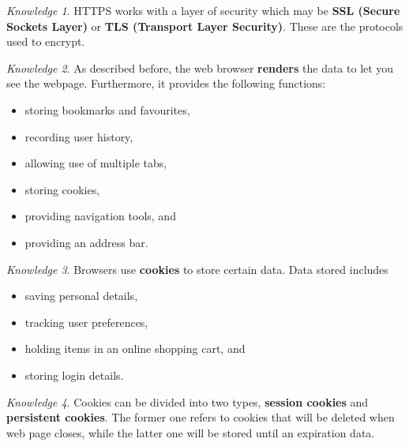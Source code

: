 \documentclass[8pt]{article}
\theoremstyle{remark}
\newtheorem{knowledge}{Knowledge}[subsection]
\begin{document}
            \begin{knowledge}
                HTTPS works with a layer of security which may be \textbf{SSL (Secure Sockets Layer)} or \textbf{TLS (Transport Layer Security)}. These are the protocols used to encrypt.
            \end{knowledge}

            \begin{knowledge}
                As described before, the web browser \textbf{renders} the data to let you see the webpage. Furthermore, it provides the following functions:
                \begin{itemize}
                    \item storing bookmarks and favourites,
                    \item recording user history,
                    \item allowing use of multiple tabs,
                    \item storing cookies,
                    \item providing navigation tools, and
                    \item providing an address bar.
                \end{itemize}
            \end{knowledge}

            \begin{knowledge}
                Browsers use \textbf{cookies} to store certain data. Data stored includes
                \begin{itemize}
                    \item saving personal details,
                    \item tracking user preferences,
                    \item holding items in an online shopping cart, and
                    \item storing login details.
                \end{itemize}
            \end{knowledge}

            \begin{knowledge}
                Cookies can be divided into two types, \textbf{session cookies} and \textbf{persistent cookies}. The former one refers to cookies that will be deleted when web page closes, while the latter one will be stored until an expiration data.
            \end{knowledge}
\end{document}
